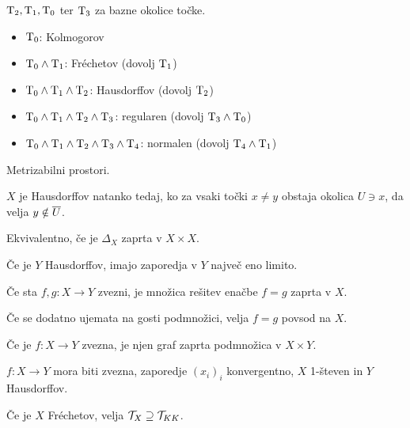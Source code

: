 
$\text{T}_{2}, \text{T}_{1}, \text{T}_{0}$ ter $\text{T}_{3}$ za bazne okolice točke.


\begin{itemize}
  \item $\text{T}_{0}$: Kolmogorov
  \item $\text{T}_{0} \land \text{T}_{1}$: Fréchetov (dovolj $\text{T}_{1}$)
  \item $\text{T}_{0} \land \text{T}_{1} \land \text{T}_{2}$: Hausdorffov (dovolj $\text{T}_{2}$)
  \item $\text{T}_{0} \land \text{T}_{1} \land \text{T}_{2} \land \text{T}_{3}$:
    regularen (dovolj $\text{T}_{3} \land \text{T}_{0}$)
  \item $\text{T}_{0} \land \text{T}_{1} \land \text{T}_{2} \land \text{T}_{3} \land \text{T}_{4}$:
    normalen (dovolj $\text{T}_{4} \land \text{T}_{1}$)
\end{itemize}


Metrizabilni prostori.


$X$ je Hausdorffov natanko tedaj, ko za vsaki točki $x \ne y$ obstaja okolica
$U \ni x$, da velja $y \notin \overline{U}$.

Ekvivalentno, če je $\Delta_X$ zaprta v $X \times X$.


Če je $Y$ Hausdorffov, imajo zaporedja v $Y$ največ eno limito.

Če sta $f, g: X \to Y$ zvezni, je množica rešitev enačbe $f = g$ zaprta v $X$.

Če se dodatno ujemata na gosti podmnožici, velja $f = g$ povsod na $X$.

Če je $f: X \to Y$ zvezna, je njen graf zaprta podmnožica v $X \times Y$.


$f: X \to Y$ mora biti zvezna, zaporedje $(x_i)_i$ konvergentno, $X$ 1-števen
in $Y$ Hausdorffov.


Če je $X$ Fréchetov, velja $\mathcal{T}_X \supseteq \mathcal{T}_{KK}$.

